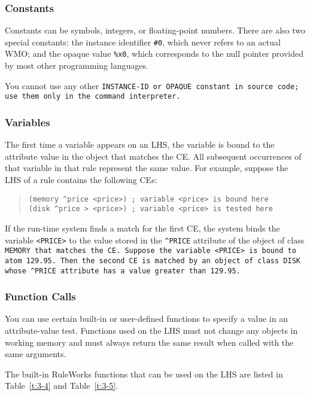 \subsubsection{Constants}

Constants can be symbols, integers, or floating-point numbers. There
are also two special constants: the instance identifier \verb|#0|,
which never refers to an actual WMO; and the opaque value \verb|%x0|,
which corresponds to the
null pointer provided by most other programming languages.

You cannot use any other \tt{INSTANCE-ID} or \tt{OPAQUE} constant in
source code; use them only in the command interpreter.

\subsubsection{Variables}

The first time a variable appears on an LHS, the variable is bound to
the attribute value in the object that matches the CE. All subsequent
occurrences of that variable in that rule represent the same
value. For example, suppose the LHS of a rule contains the following
CEs:
\begin{quote}
\begin{verbatim}
(memory ^price <price>) ; variable <price> is bound here
(disk ^price > <price>) ; variable <price> is tested here
\end{verbatim}
\end{quote}

If the run-time system finds a match for the first CE, the system
binds the variable \verb|<PRICE>| to the value stored in the
\verb|^PRICE| attribute of the object of class \tt{MEMORY} that
matches the CE. Suppose the variable \verb|<PRICE>| is bound to atom
129.95. Then the second CE is matched by an object of class \tt{DISK}
whose \verb|^PRICE| attribute has a value greater than 129.95.

\subsubsection{Function Calls}

You can use certain built-in or user-defined functions to specify a
value in an attribute-value test. Functions used on the LHS must not
change any objects in working memory and must always return the same
result when called with the same arguments.

The built-in RuleWorks functions that can be used on the LHS are
listed in Table~\ref{t:3-4} and Table~\ref{t:3-5}.

